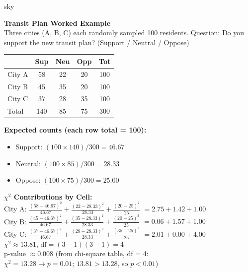 \documentclass[10pt]{article}
\begin{document}
\begin{skillbox}{sky}
\begin{minipage}[t]{0.48\linewidth}
    \textbf{Transit Plan Worked Example}\\
    Three cities (A, B, C) each randomly sampled 100 residents.
    Question: Do you support the new transit plan?
    (Support / Neutral / Oppose)

    \renewcommand{\arraystretch}{1.3}
    \begin{center}\small
    \begin{tabular}{@{} l c c c c @{}}
    \hline
              & Sup & Neu & Opp & Tot \\
    \hline
    City A    & 58  & 22  & 20  & 100 \\
    City B    & 45  & 35  & 20  & 100 \\
    City C    & 37  & 28  & 35  & 100 \\
    \hline
    Total     & 140 & 85  & 75  & 300 \\
    \hline
    \end{tabular}
    \end{center}

    \textbf{Expected counts (each row total = 100):}
    \begin{itemize}
        \item Support: $(100 \times 140)/300 = 46.67$
        \item Neutral: $(100 \times 85)/300 = 28.33$
        \item Oppose: $(100 \times 75)/300 = 25.00$
    \end{itemize}
\end{minipage}
\hfill
\begin{minipage}[t]{0.48\linewidth}
    \textbf{$\chi^2$ Contributions by Cell:}\\[4pt]
    City A: $\frac{(58-46.67)^2}{46.67} + \frac{(22-28.33)^2}{28.33} + \frac{(20-25)^2}{25}$
    $= 2.75 + 1.42 + 1.00$\\[4pt]
    City B: $\frac{(45-46.67)^2}{46.67} + \frac{(35-28.33)^2}{28.33} + \frac{(20-25)^2}{25}$
    $= 0.06 + 1.57 + 1.00$\\[4pt]
    City C: $\frac{(37-46.67)^2}{46.67} + \frac{(28-28.33)^2}{28.33} + \frac{(35-25)^2}{25}$
    $= 2.01 + 0.00 + 4.00$\\[6pt]
    $\chi^2 \approx 13.81$, $\text{df} = (3-1)(3-1) = 4$\\[4pt]
    p-value $\approx 0.008$ (from chi-square table, df = 4:\\
    $\chi^2 = 13.28 \to p = 0.01$; $13.81 > 13.28$, so $p < 0.01$)
\end{minipage}
\end{skillbox}
\end{document}
